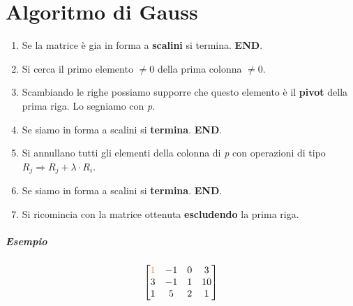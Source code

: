 \documentclass[a4paper, 12pt]{report}
\begin{document}
            \section{Algoritmo di Gauss}
                \begin{enumerate}
                    \item Se la matrice è gia in forma a \textbf{scalini} si termina. \textbf{END}.
                    \item Si cerca il primo elemento $\neq 0$ della prima colonna $\neq 0$.
                    \item Scambiando le righe possiamo supporre che questo elemento è il \textbf{pivot} della prima riga. Lo segniamo con \textit{p}. 
                    \item Se siamo in forma a scalini si \textbf{termina}. \textbf{END}.
                    \item Si annullano tutti gli elementi della colonna di \textit{p} con operazioni di tipo $R_j \Rightarrow R_j + \lambda \cdot R_i$.
                    \item Se siamo in forma a scalini si \textbf{termina}. \textbf{END}.
                    \item Si ricomincia con la matrice ottenuta \textbf{escludendo} la prima riga.
                \end{enumerate}
                \subparagraph{Esempio}
                $$
                \begin{bmatrix}
                    \textcolor{orange}{1} & -1 & 0 & 3\\
                    3 & -1 & 1 & 10\\
                    1 & 5 & 2 & 1
                \end{bmatrix}
                $$
\end{document}
